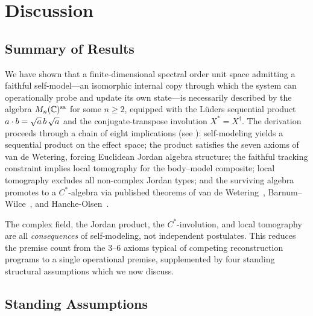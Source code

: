 
\section{Discussion}\label{sec:discussion}

\subsection{Summary of Results}\label{subsec:summary}

We have shown that a finite-dimensional spectral order unit space
admitting a faithful self-model---an isomorphic internal copy through
which the system can operationally probe and update its own state---is
necessarily described by the algebra $\Mnsa{n}$ for some $n \geq 2$,
equipped with the L\"uders sequential product
$\sp{a}{b} = \sqrt{a}\, b\, \sqrt{a}$ and the conjugate-transpose
involution $X^{*} = X^{\dagger}$.  The derivation proceeds through a
chain of eight implications (see ): self-modeling
yields a sequential product on the effect space; the product satisfies
the seven axioms of van de Wetering, forcing Euclidean Jordan algebra
structure; the faithful tracking constraint implies local tomography
for the body--model composite; local tomography excludes all
non-complex Jordan types; and the surviving algebra promotes to a
$C^{*}$-algebra via published theorems of van de
Wetering~\cite{vandeWetering2019b},
Barnum--Wilce~\cite{BarnumWilce2014}, and
Hanche-Olsen~\cite{HancheOlsen1985}.

The complex field, the Jordan product, the $C^{*}$-involution, and
local tomography are all \emph{consequences} of self-modeling, not
independent postulates.  This reduces the premise count from the 3--6
axioms typical of competing reconstruction programs to a single
operational premise, supplemented by four standing structural
assumptions which we now discuss.


\subsection{Standing Assumptions}\label{subsec:assumptions}

